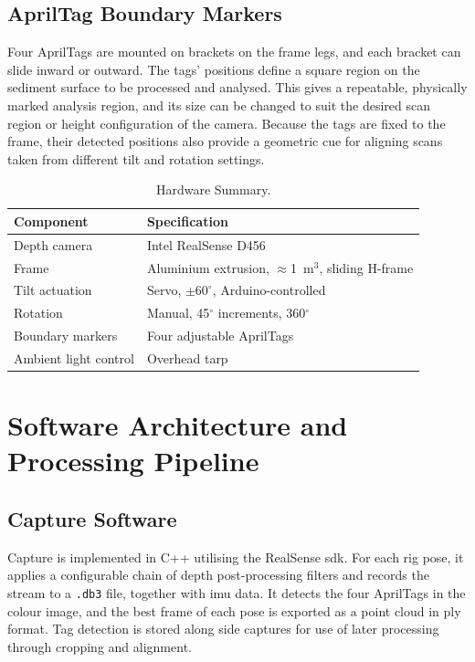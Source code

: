 \subsection{AprilTag Boundary Markers}
Four AprilTags are mounted on brackets on the frame legs, and each bracket can slide inward or outward. The tags' positions define a square region on the sediment surface to be processed and analysed. This gives a repeatable, physically marked analysis region, and its size can be changed to suit the desired scan region or height configuration of the camera. Because the tags are fixed to the frame, their detected positions also provide a geometric cue for aligning scans taken from different tilt and rotation settings.

\begin{table}[!t]
	\centering
	\caption{Hardware Summary.}
	\label{tab:hardware}
	\small
	\begin{tabular}{@{}ll@{}}
		\toprule
		\textbf{Component} & \textbf{Specification} \\
		\midrule
		Depth camera & Intel RealSense D456 \\
		Frame & Aluminium extrusion, $\approx$1~m$^3$, sliding H-frame \\
		Tilt actuation & Servo, $\pm60^{\circ}$, Arduino-controlled \\
		Rotation & Manual, 45$^{\circ}$ increments, 360$^{\circ}$ \\
		Boundary markers & Four adjustable AprilTags \\
		Ambient light control & Overhead tarp \\
		\bottomrule
	\end{tabular}
\end{table}

\section{Software Architecture and Processing Pipeline}

\subsection{Capture Software}
Capture is implemented in C++ utilising the RealSense \gls{sdk}. For each rig pose, it applies a configurable chain of depth post-processing filters and records the stream to a \texttt{.db3} file, together with \gls{imu} data. It detects the four AprilTags in the colour image, and the best frame of each pose is exported as a point cloud in \gls{ply} format. Tag detection is stored along side captures for use of later processing through cropping and alignment.

